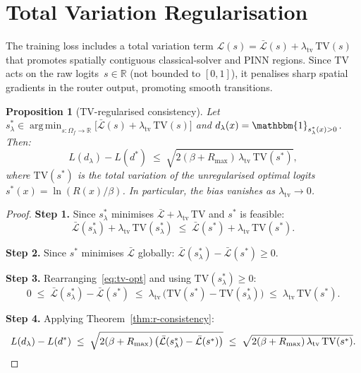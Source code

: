 \documentclass[11pt]{article}
\newtheorem{proposition}[theorem]{Proposition}
\DeclareMathOperator*{\argmin}{arg\,min}
\newcommand{\R}{\mathbb{R}}
\newcommand{\Lcal}{\mathcal{L}}
\newcommand{\TV}{\mathrm{TV}}
\newcommand{\ind}{\mathbbm{1}}
\begin{document}
\section{Total Variation Regularisation}
\label{sec:tv}

The training loss includes a total variation term
$\Lcal(s) = \bar{\Lcal}(s) + \lambda_{\mathrm{tv}}\,\TV(s)$
that promotes spatially contiguous classical-solver and PINN regions.  Since TV
acts on the raw logits~$s \in \R$ (not bounded to $[0,1]$), it penalises sharp
spatial gradients in the router output, promoting smooth transitions.

\begin{proposition}[TV-regularised consistency]\label{prop:tv}
Let $s^*_\lambda \in \argmin_{s \colon \Omega_f \to \R}
  \bigl[\bar{\Lcal}(s) + \lambda_{\mathrm{tv}}\,\TV(s)\bigr]$
and $d_\lambda(x) = \ind_{s^*_\lambda(x) > 0}$.  Then:
\begin{equation}\label{eq:tv-bound}
  L(d_\lambda) - L(d^*)
  \;\le\; \sqrt{2(\beta + R_{\max})\,\lambda_{\mathrm{tv}}\,\TV(s^*)},
\end{equation}
where $\TV(s^*)$ is the total variation of the unregularised optimal logits
$s^*(x) = \ln(R(x)/\beta)$.  In particular, the bias vanishes as
$\lambda_{\mathrm{tv}} \to 0$.
\end{proposition}

\begin{proof}
\textbf{Step 1.}  Since $s^*_\lambda$ minimises $\bar{\Lcal} + \lambda_{\mathrm{tv}}\,\TV$
and $s^*$ is feasible:
\begin{equation}\label{eq:tv-opt}
  \bar{\Lcal}(s^*_\lambda) + \lambda_{\mathrm{tv}}\,\TV(s^*_\lambda)
  \;\le\; \bar{\Lcal}(s^*) + \lambda_{\mathrm{tv}}\,\TV(s^*).
\end{equation}

\textbf{Step 2.}  Since $s^*$ minimises $\bar{\Lcal}$ globally:
$\bar{\Lcal}(s^*_\lambda) - \bar{\Lcal}(s^*) \ge 0$.

\textbf{Step 3.}  Rearranging~\eqref{eq:tv-opt} and using $\TV(s^*_\lambda) \ge 0$:
\begin{equation}\label{eq:surr-gap}
  0 \;\le\; \bar{\Lcal}(s^*_\lambda) - \bar{\Lcal}(s^*)
  \;\le\; \lambda_{\mathrm{tv}}\,\bigl(\TV(s^*) - \TV(s^*_\lambda)\bigr)
  \;\le\; \lambda_{\mathrm{tv}}\,\TV(s^*).
\end{equation}

\textbf{Step 4.}  Applying Theorem~\ref{thm:r-consistency}:
\begin{equation}\label{eq:tv-final}
  L(d_\lambda) - L(d^*)
  \;\le\; \sqrt{2(\beta + R_{\max})\,
    \bigl(\bar{\Lcal}(s^*_\lambda) - \bar{\Lcal}(s^*)\bigr)}
  \;\le\; \sqrt{2(\beta + R_{\max})\,\lambda_{\mathrm{tv}}\,\TV(s^*)}. \qedhere
\end{equation}
\end{proof}
\end{document}
